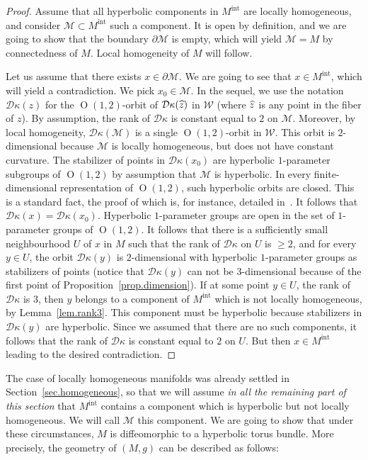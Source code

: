 \documentclass[11pt]{article}
\theoremstyle{definition}
\numberwithin{equation}{section}
\numberwithin{figure}{section}
\numberwithin{table}{section}
\DeclareMathOperator{\Omp}{O}%
\newcommand{\mint}{{M^{\intl}}}
\DeclareMathOperator{\intl}{int}
\newcommand{\calm}{\mathcal{M}}
\newcommand*\dk{{\mathcal{D}\kappa}}
\newcommand{\hz}{{\hat{z}}}
\let\oldhat\hat
\renewcommand*\hat[1]{\mathchoice{\widehat{#1}}{\widehat{#1}}{\widehat{#1}}{\oldhat{#1}}}
\begin{document}
\begin{proof}
Assume that all hyperbolic components in $\mint$ are locally homogeneous, and consider $\calm \subset \mint$ such a component. It is open by definition, and we are going to show that the boundary $\partial \calm$ is empty, which will yield $\calm=M$ by connectedness of $M$. Local homogeneity of $M$ will follow.

Let us assume that there exists $x \in \partial \calm$. We are going to see that $x \in \mint$, which will yield a contradiction. We pick $x_0 \in \calm$. In the sequel, we use the notation $\dk(z)$ for the $\Omp(1,2)$-orbit of $\dk(\hz)$ in ${\mathcal W}$ (where $\hz$ is any point in the fiber of $z$). By assumption, the rank of $\dk$ is constant equal to $2$ on $\calm$. Moreover, by local homogeneity, $\dk({\calm})$ is a single $\Omp(1,2)$-orbit in ${\mathcal W}$. This orbit is $2$-dimensional because $\calm$ is locally homogeneous, but does not have constant curvature. The stabilizer of points in $\dk(x_0)$ are hyperbolic $1$-parameter subgroups of $\Omp(1,2)$ by assumption that ${\mathcal M}$ is hyperbolic. In every finite-dimensional representation of $\Omp(1,2)$, such hyperbolic orbits are closed. This is a standard fact, the proof of which is, for instance, detailed in~\cite[Appendix~B]{frances.open}. It follows that $\dk(x)=\dk(x_0)$. Hyperbolic $1$-parameter groups are open in the set of $1$-parameter groups of $\Omp(1,2)$. It follows that there is a sufficiently small neighbourhood $U$ of $x$ in $M$ such that the rank of $\dk$ on $U$ is $\geq 2$, and for every $y \in U$, the orbit $\dk(y)$ is $2$-dimensional with hyperbolic $1$-parameter groups as stabilizers of points (notice that $\dk(y)$ can not be $3$-dimensional because of the first point of Proposition~\ref{prop.dimension}). If at some point $y \in U$, the rank of $\dk$ is $3$, then $y$ belongs to a component of $\mint$ which is not locally homogeneous, by Lemma~\ref{lem.rank3}. This component must be hyperbolic because stabilizers in $\dk(y)$ are hyperbolic. Since we assumed that there are no such components, it follows that the rank of $\dk$ is constant equal to $2$ on $U$. But then $x \in \mint$ leading to the desired contradiction.
\end{proof}

The case of locally homogeneous manifolds was already settled in Section~\ref{sec.homogeneous}, so that we will assume \emph{in all the remaining part of this section} that $\mint$ contains a component which is hyperbolic but not locally homogeneous. We will call $\calm$ this component. We are going to show that under these circumstances, $M$ is diffeomorphic to a hyperbolic torus bundle. More precisely, the geometry of $(M,g)$ can be described as follows:
\end{document}
